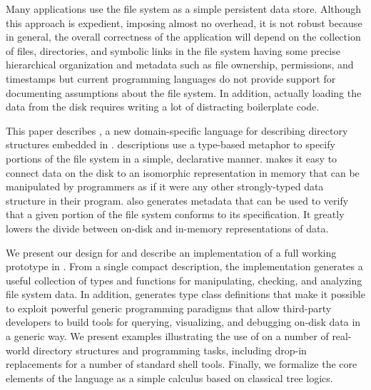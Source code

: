 Many applications use the file system as a simple persistent data
store.  Although this approach is expedient, imposing almost no
overhead, it is not robust because in general, the overall correctness
of the application will depend on the collection of files,
directories, and symbolic links in the file system having some precise
hierarchical organization and metadata such as file ownership,
permissions, and timestamps but current programming languages do not
provide support for documenting assumptions about the file system. In
addition, actually loading the data from the disk requires writing a
lot of distracting boilerplate code.

This paper describes \forest{}, a new domain-specific language for
describing directory structures embedded in \haskell{}. \forest{}
descriptions use a type-based metaphor to specify portions of the file
system in a simple, declarative manner.  \forest{} makes it easy to
connect data on the disk to an isomorphic representation in memory
that can be manipulated by programmers as if it were any other
strongly-typed data structure in their program.  \forest{} also
generates metadata that can be used to verify that a given portion of
the file system conforms to its specification.  It greatly lowers the
divide between on-disk and in-memory representations of data.

We present our design for \forest{} and describe an implementation of
a full working prototype in \haskell{}. From a single compact
description, the \forest{} implementation generates a useful
collection of \haskell{} types and functions for manipulating,
checking, and analyzing file system data.   In addition, \forest{}
generates type class definitions that make it possible to
exploit powerful
generic programming paradigms that
allow third-party developers to build tools for querying,
visualizing, and debugging on-disk data in a generic way. We
present examples illustrating the use of \forest{} on a number of
real-world directory structures and programming tasks, including
drop-in replacements for a number of standard shell tools. Finally, we
formalize the core elements of the language as a simple calculus based
on classical tree logics.